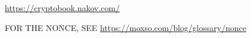 %
%
%
%
%
%
%
%
%
%

\url{https://cryptobook.nakov.com/}

FOR THE NONCE, SEE \url{https://moxso.com/blog/glossary/nonce}





%





